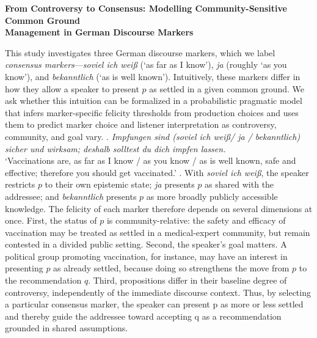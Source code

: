 \documentclass[11pt,a4paper]{article}
\begin{document}
\noindent\textbf{\large From Controversy to Consensus: Modelling Community-Sensitive Common Ground \\ Management in German Discourse Markers}

\smallskip

\noindent This study investigates three German discourse markers, which we label \emph{consensus markers}---\textit{soviel ich wei\ss} (`as far as I know'), \textit{ja} (roughly `as you know'), and \textit{bekanntlich} (`as is well known').
Intuitively, these markers differ in how they allow a speaker to present $p$ as settled in a given common ground.
We ask whether this intuition can be formalized in a probabilistic pragmatic model that infers marker-specific felicity thresholds from production choices and uses them to predict marker choice and listener interpretation as controversy, community, and goal vary.
\ex. \textit{Impfungen sind (soviel ich wei\ss / ja / bekanntlich) sicher und wirksam; deshalb solltest du dich impfen lassen.}\\
`Vaccinations are, as far as I know / as you know / as is well known, safe and effective; therefore you should get vaccinated.'
\z.
With \textit{soviel ich wei\ss}, the speaker restricts $p$ to their own epistemic state; \textit{ja} presents $p$ as shared with the addressee; and \textit{bekanntlich} presents $p$ as more broadly publicly accessible knowledge.
The felicity of each marker therefore depends on several dimensions at once.
First, the status of $p$ is community-relative: the safety and efficacy of vaccination may be treated as settled in a medical-expert community, but remain contested in a divided public setting.
Second, the speaker's goal matters.
A political group promoting vaccination, for instance, may have an interest in presenting $p$ as already settled, because doing so strengthens the move from $p$ to the recommendation $q$.
Third, propositions differ in their baseline degree of controversy, independently of the immediate discourse context.
Thus, by selecting a particular consensus marker, the speaker can present p as more or less settled and thereby guide the addressee toward accepting q as a recommendation grounded in shared assumptions.
\end{document}
